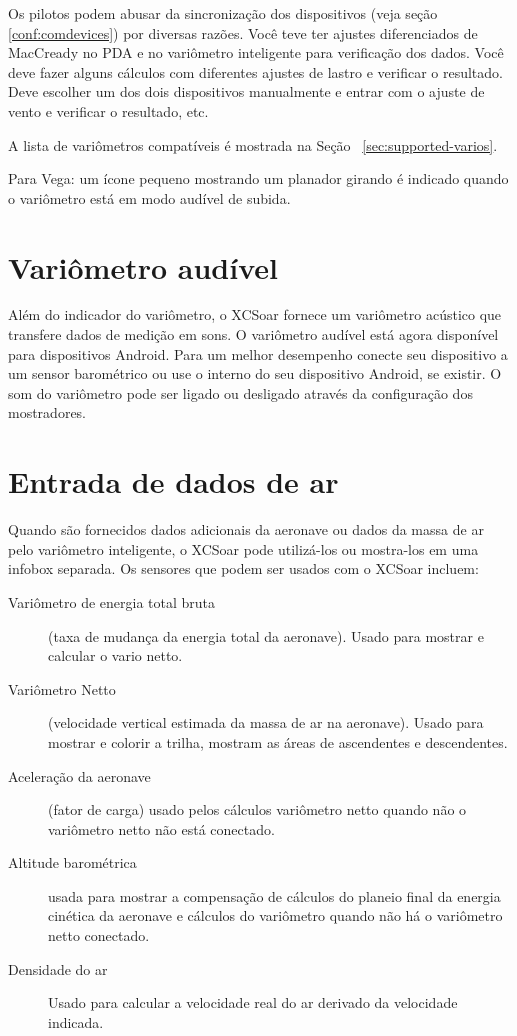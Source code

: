 Os pilotos podem abusar da sincronização dos dispositivos (veja seção \ref{conf:comdevices}) por diversas razões.  Você teve ter ajustes diferenciados de MacCready no PDA e no variômetro inteligente para verificação dos dados. Você deve fazer alguns cálculos com diferentes ajustes de lastro e verificar o resultado.  Deve escolher um dos dois dispositivos manualmente e entrar com o ajuste de vento e verificar o resultado, etc.

A lista de variômetros compatíveis é mostrada na Seção ~\ref{sec:supported-varios}.

Para Vega: um ícone pequeno mostrando um planador girando é indicado quando o variômetro está em modo audível de subida.

\section{Variômetro audível}

Além do indicador do variômetro, o XCSoar fornece um variômetro acústico que transfere dados de medição em sons.  O variômetro audível está agora disponível para dispositivos Android.  Para um melhor desempenho conecte seu dispositivo a um sensor barométrico ou use o interno do seu dispositivo Android, se existir.  O som do variômetro pode ser ligado ou desligado através da configuração dos mostradores.


\section{Entrada de dados de ar}

Quando são fornecidos dados adicionais da aeronave ou dados da massa de ar pelo variômetro inteligente, o XCSoar pode utilizá-los ou mostra-los em uma infobox separada.  Os sensores que podem ser usados com o XCSoar incluem:
\begin{description}
\item[Variômetro de energia total bruta] (taxa de mudança da energia total da aeronave).  Usado para mostrar e calcular o vario netto.
\item[Variômetro Netto] (velocidade vertical estimada da massa de ar na aeronave).   Usado para mostrar e colorir a trilha, mostram as áreas de ascendentes e descendentes.
\item[Aceleração da aeronave] (fator de carga) usado pelos cálculos variômetro netto quando não o variômetro netto não está conectado. 
\item[Altitude barométrica] usada para mostrar a compensação de cálculos do planeio final da energia cinética da aeronave e cálculos do variômetro quando não há o variômetro netto conectado.
\item[Densidade do ar] Usado para calcular a velocidade real do ar derivado da velocidade indicada.
\end{description}

